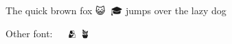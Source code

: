 \documentclass{article}
\begin{document}
  The quick brown fox {\emojifont 😺👅👩🎓} jumps over the lazy dog

  Other font: {\emojifont 🧑 🎄 🫂 🪴}
\end{document}

